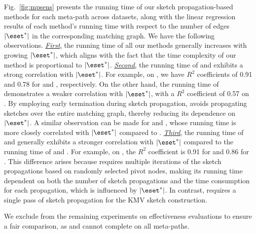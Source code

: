 Fig.~\ref{fig:mpsens} presents the running time of our sketch propagation-based methods for each meta-path across datasets, along with the linear regression results of each method's running time with respect to the number of edges $|\eset^*|$ in the corresponding matching graph. We have the following observations. \underline{\textit{First},} the running time of all our methods generally increases with growing $|\eset^*|$, which aligns with the fact that the time complexity of our method is proportional to $|\eset^*|$.
\underline{\textit{Second},} the running time of \glod and \perd exhibits a strong correlation with $|\eset^*|$. For example, on \dsfreebase, we have $R^2$ coefficients of 0.91 and 0.78 for \glod and \perd, respectively. On the other hand, the running time of \perde demonstrates a weaker correlation with $|\eset^*|$, with a $R^2$ coefficient of 0.57 on \dsfreebase. By employing early termination during sketch propagation, \perde avoids propagating sketches over the entire matching graph, thereby reducing its dependence on $|\eset^*|$. A similar observation can be made for \gloh and \perh, whose running time is more closely correlated with $|\eset^*|$ compared to \perhe.
\underline{\textit{Third},} the running time of \glod and \perd generally exhibits a stronger correlation with $|\eset^*|$ compared to the running time of \gloh and \perh. For example, on \dspubmed, the $R^2$ coefficient is 0.91 for \glod and 0.86 for \gloh. This difference arises because \gloh requires multiple iterations of the sketch propagations based on randomly selected pivot nodes, making its running time dependent on both the number of sketch propagations and the time consumption for each propagation, which is influenced by $|\eset^*|$. In contrast, \glod requires a single pass of sketch propagation for the KMV sketch construction.

We exclude \dsyelp from the remaining experiments on effectiveness evaluations to ensure a fair comparison, as \wcd and \wch cannot complete on all meta-paths.

